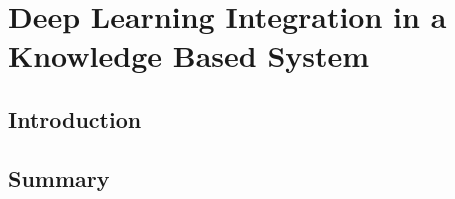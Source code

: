 \chapter{Deep Learning Integration in a Knowledge Based System}
\label{chap:dlintegrationkbs}


\section{Introduction}

\section{Summary}